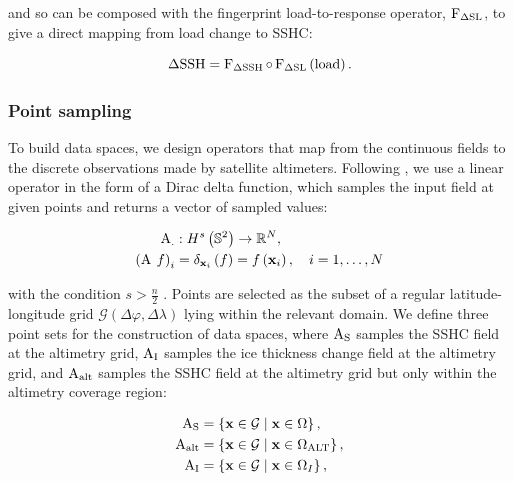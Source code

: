 and so can be composed with the fingerprint load-to-response operator, $\operatorname{{F}}_{{\Delta \mathrm{SL}}}$, to give a direct mapping from load change to SSHC:

\begin{equation}
    \Delta \mathrm{SSH} = \operatorname{{F}}_{{\Delta \mathrm{SSH}}} \circ \operatorname{{F}}_{{\Delta \mathrm{SL}}} \left(\text{load}\right).
\end{equation}

\subsubsection{Point sampling}


To build data spaces, we design operators that map from the continuous fields to the discrete observations made by satellite altimeters. Following , we use a linear operator in the form of a Dirac delta function, which samples the input field at given points and returns a vector of sampled values:

\begin{align}
  \operatorname{{A}}_{{\mathrm{.}}}&: H^s\left(\mathbb{S}^2\right) \to \mathbb{R}^N, \\
  \left(\operatorname{{A}}_{{\mathrm{}}}\, f\right)_i &= \delta_{\mathbf{x}_i}\left(f\right) = f\left(\mathbf{x}_i\right), \quad i = 1, \dots, N
\end{align}

with the condition $s > \frac{n}{2}$ \autocite{rudinFunctionalAnalysis1991}. Points are selected as the subset of a regular latitude-longitude grid $\mathcal{G}\left(\Delta\varphi, \Delta\lambda\right)$ lying within the relevant domain. We define three point sets for the construction of data spaces, where $\operatorname{{A}}_{{\mathrm{S}}}$ samples the SSHC field at the altimetry grid, $\operatorname{{A}}_{{\mathrm{I}}}$ samples the ice thickness change field at the altimetry grid, and $\operatorname{{A}}_{{\mathrm{alt}}}$ samples the SSHC field at the altimetry grid but only within the altimetry coverage region:

\begin{align}
  \operatorname{{A}}_{{\mathrm{S}}} &= \left\{ \mathbf{x} \in \mathcal{G} \mid \mathbf{x} \in \Omega \right\}, \\
  \operatorname{{A}}_{{\mathrm{alt}}} &= \left\{ \mathbf{x} \in \mathcal{G} \mid \mathbf{x} \in \Omega_{\mathrm{ALT}} \right\},\\
  \operatorname{{A}}_{{\mathrm{I}}} &= \left\{ \mathbf{x} \in \mathcal{G} \mid \mathbf{x} \in \Omega_I \right\},
\end{align}

